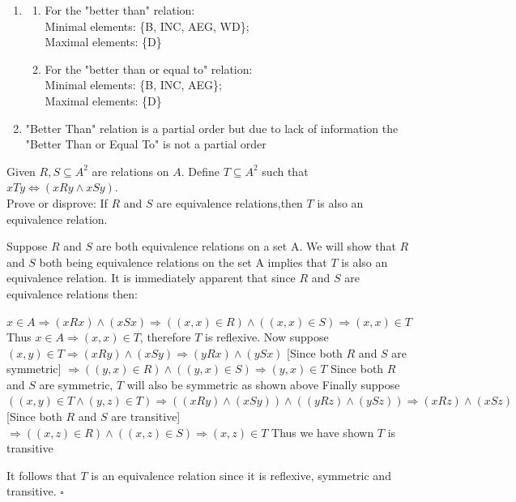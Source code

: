 \documentclass[12pt]{article}
\newenvironment{solution}[2][Solution]{ \begin{trivlist}
\item[\hskip \labelsep {\bfseries #1}]}{\end{trivlist}}
\newenvironment{problem}[2][Problem]{\begin{trivlist}
\item[\hskip \labelsep {\bfseries #1}\hskip \labelsep {\bfseries #2.}]}{\end{trivlist}}
\begin{document}
\begin{solution}{7}
\begin{enumerate}[label=\alph*)]
\item \begin{enumerate}[label=\roman*)]
\item For the "better than" relation: \\Minimal elements: \{B, INC, AEG, WD\};\\
Maximal elements: \{D\}
\item For the "better than or equal to" relation: \\Minimal elements: \{B, INC, AEG\};\\
Maximal elements: \{D\}
\end{enumerate}
\item "Better Than" relation is a partial order but due to lack of information the "Better Than or Equal To" is not a partial order
\end{enumerate}
\end{solution}
\pagebreak


\begin{problem}{8}Given $R, S \subseteq A^2$ are relations on $A$. Define $T \subseteq A^2$ such that \\ $xTy \Leftrightarrow (xRy \wedge xSy)$. \\Prove or disprove: If  $R$ and $S$ are equivalence relations,then $T$ is also an equivalence relation.
\end{problem}
\begin{solution}{8}
Suppose $R$ and $S$ are both equivalence relations on a set A. We will show that $R$ and $S$ both being equivalence relations on the set A implies that $T$ is also an equivalence relation.
\vskip 0.2in
It is immediately apparent that since $R$ and $S$ are equivalence relations then:

$x \in A \Rightarrow (xRx)\wedge(xSx)\Rightarrow ((x,x) \in R) \wedge ((x,x) \in S) \Rightarrow (x,x) \in T$
\vskip 0.1in
Thus $x \in A \Rightarrow (x,x) \in T$, therefore $T$ is reflexive.
\vskip 0.2in
Now suppose $(x,y) \in T \Rightarrow (xRy)\wedge(xSy)\Rightarrow(yRx)\wedge(ySx)$ \vskip 0.1in
[Since both $R$ and $S$ are symmetric]
$\Rightarrow((y,x) \in R) \wedge ((y,x) \in S) \Rightarrow (y,x) \in T$
\vskip 0.2in
Since both $R$ and $S$ are symmetric, $T$ will also be symmetric as shown above
\vskip 0.2in
Finally suppose $((x,y) \in T \wedge (y,z) \in T) \Rightarrow ((xRy)\wedge(xSy))\wedge((yRz)\wedge(ySz))\Rightarrow(xRz)\wedge(xSz)$ \vskip 0.1in
[Since both $R$ and $S$ are transitive]
$\Rightarrow((x,z) \in R) \wedge ((x,z) \in S) \Rightarrow (x,z) \in T$
Thus we have shown $T$ is transitive

It follows that $T$ is an equivalence relation since it is reflexive, symmetric and transitive.  $\square$
\end{solution}
\end{document}
